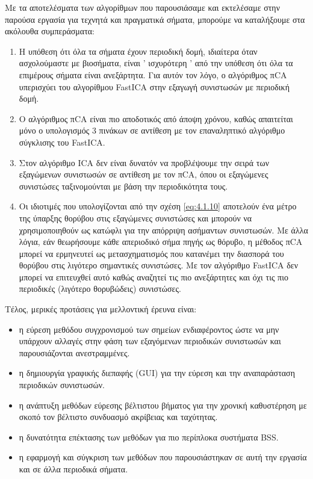 Με τα αποτελέσματα των αλγορίθμων που παρουσιάσαμε και εκτελέσαμε στην παρούσα εργασία για τεχνητά και πραγματικά σήματα, μπορούμε να καταλήξουμε στα ακόλουθα συμπεράσματα:
\begin{enumerate}
    \item Η υπόθεση ότι όλα τα σήματα έχουν περιοδική δομή, ιδιαίτερα όταν ασχολούμαστε με βιοσήματα, είναι ' ισχυρότερη ' από την υπόθεση ότι όλα τα επιμέρους σήματα είναι ανεξάρτητα. Για αυτόν τον λόγο, ο αλγόριθμος π\en CA \gr υπερισχύει του αλγορίθμου \en FastICA \gr στην εξαγωγή συνιστωσών με περιοδική δομή.
    \item Ο αλγόριθμος π\en CA \gr είναι πιο αποδοτικός από άποψη χρόνου, καθώς απαιτείται μόνο ο υπολογισμός 3 πινάκων σε αντίθεση με τον επαναληπτικό αλγόριθμο σύγκλισης του \en FastICA. \gr
    \item Στον αλγόριθμο \en ICA \gr δεν είναι δυνατόν να προβλέψουμε την σειρά των εξαγώμενων συνιστωσών σε αντίθεση με τον π\en CA, \gr όπου οι εξαγώμενες συνιστώσες ταξινομούνται με βάση την περιοδικότητα τους.
    \item Οι ιδιοτιμές που υπολογίζονται από την σχέση \eqref{eq:4.1.10} αποτελούν ένα μέτρο της ύπαρξης θορύβου στις εξαγώμενες συνιστώσες και μπορούν να χρησιμοποιηθούν ως κατώφλι για την απόρριψη ασήμαντων συνιστωσών. Με άλλα λόγια, εάν θεωρήσουμε κάθε απεριοδικό σήμα πηγής ως θόρυβο, η μέθοδος π\en CA \gr μπορεί να ερμηνευτεί ως μετασχηματισμός που κατανέμει την διασπορά του θορύβου στις λιγότερο σημαντικές συνιστώσες. Με τον αλγόριθμο \en FastICA \gr δεν μπορεί να επιτευχθεί αυτό καθώς αναζητεί τις πιο ανεξάρτητες και όχι τις πιο περιοδικές (λιγότερο θορυβώδεις) συνιστώσες.
\end{enumerate}
\newpage
\noindent Τέλος, μερικές προτάσεις για μελλοντική έρευνα είναι:
\begin{itemize}
    \item η εύρεση μεθόδου συγχρονισμού των σημείων ενδιαφέροντος ώστε να μην υπάρχουν αλλαγές στην φάση των εξαγόμενων περιοδικών συνιστωσών και παρουσιάζονται ανεστραμμένες.
    \item η δημιουργία γραφικής διεπαφής (\en GUI) \gr για την εύρεση και την αναπαράσταση περιοδικών συνιστωσών.
    \item η ανάπτυξη μεθόδων εύρεσης βέλτιστου βήματος για την χρονική καθυστέρηση με σκοπό τον βέλτιστο συνδυασμό ακρίβειας και ταχύτητας.
    \item η δυνατότητα επέκτασης των μεθόδων για πιο περίπλοκα συστήματα \en BSS. \gr
    \item η εφαρμογή και σύγκριση των μεθόδων που παρουσιάστηκαν σε αυτή την εργασία και σε άλλα περιοδικά σήματα.
\end{itemize}